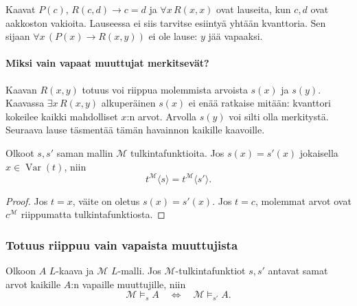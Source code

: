 \documentclass[11pt,a4paper]{amsart}
\begin{document}
\begin{example}
  Kaavat $P(c)$, $R(c,d)\to c=d$ ja $\forall x\,R(x,x)$ ovat
  lauseita, kun $c,d$ ovat aakkoston vakioita. Lauseessa ei siis
  tarvitse esiintyä yhtään kvanttoria. Sen sijaan
  $\forall x\,(P(x)\to R(x,y))$ ei ole lause: $y$ jää vapaaksi.
\end{example}

\paragraph{Miksi vain vapaat muuttujat merkitsevät?}
Kaavan $R(x,y)$ totuus voi riippua molemmista arvoista $s(x)$ ja
$s(y)$. Kaavassa $\exists x\,R(x,y)$ alkuperäinen $s(x)$ ei enää
ratkaise mitään: kvanttori kokeilee kaikki mahdolliset $x$:n arvot.
Arvolla $s(y)$ voi silti olla merkitystä. Seuraava lause täsmentää
tämän havainnon kaikille kaavoille.

\begin{lemma}
  \label{lem:logic2-term-agreement}
  Olkoot $s,s'$ saman mallin $\mathcal M$ tulkintafunktioita.
  Jos $s(x)=s'(x)$ jokaisella $x\in\operatorname{Var}(t)$, niin
  \[
    t^{\mathcal M}\langle s\rangle
    =t^{\mathcal M}\langle s'\rangle.
  \]
\end{lemma}

\begin{proof}
  Jos $t=x$, väite on oletus $s(x)=s'(x)$. Jos $t=c$, molemmat
  arvot ovat $c^{\mathcal M}$ riippumatta tulkintafunktiosta.
\end{proof}

\clearpage
\subsubsection{Totuus riippuu vain vapaista muuttujista}

\begin{theorem}
  \label{thm:logic2-free-variable-agreement}
  Olkoon $A$ $L$-kaava ja $\mathcal M$ $L$-malli. Jos
  $\mathcal M$-tulkintafunktiot $s,s'$ antavat samat arvot kaikille
  $A$:n vapaille muuttujille, niin
  \[
    \mathcal M\models_s A
    \quad\Longleftrightarrow\quad
    \mathcal M\models_{s'}A.
  \]
\end{theorem}
\end{document}
